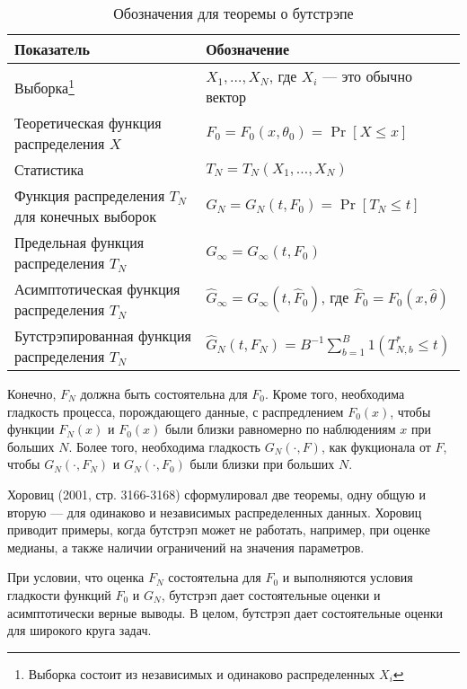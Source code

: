 \begin{table}[h]
\begin{center}
\caption{\label{tab:notatboot} Обозначения для теоремы о бутстрэпе}
\begin{minipage}{\textwidth}
\begin{tabular}{ll}
\hline
\hline
Показатель & Обозначение \\ 
\hline 
Выборка\footnote{Выборка состоит из независимых и одинаково распределенных $X_i$} & $X_1, \ldots, X_N$, где $X_i$ --- это обычно вектор \\ 
Теоретическая функция распределения $X$ & $F_0 = F_0(x, \theta_0) = \Pr[X \leq x]$ \\
Статистика & $T_N = T_N(X_1, \ldots, X_N)$ \\
Функция распределения $T_N$ для конечных выборок & $G_N = G_N(t, F_0) = \Pr[T_N \leq t]$ \\
Предельная функция распределения $T_N$ & $G_{\infty} = G_{\infty}(t, F_0)$ \\
Асимптотическая функция распределения $T_N$ & $\hat{G}_{\infty} = G_{\infty}(t, \hat{F}_0)$, где $\hat{F}_0 = F_0(x, \hat{\theta})$ \\
Бутстрэпированная функция распределения $T_N$ & $\hat{G}_N(t, F_N) = B^{-1} \sum_{b=1}^B 1(T^*_{N,b} \leq t)$ \\
\hline
\hline
\end{tabular}
\end{minipage}
\end{center}
\end{table} 

Конечно, $F_N$ должна быть состоятельна для $F_0$. Кроме того, необходима гладкость процесса, порождающего данные, с распредлением $F_0(x)$, чтобы функции $F_N(x)$ и $F_0(x)$ были  близки равномерно по наблюдениям $x$ при больших $N$. Более того, необходима гладкость $G_N(\cdot,F)$, как фукционала от $F$, чтобы  $G_N(\cdot,F_N)$ и $G_N(\cdot,F_0)$ были близки при больших $N$. 

Хоровиц (2001, стр. 3166-3168) сформулировал две теоремы, одну общую и вторую --- для одинаково и независимых распределенных данных. Хоровиц приводит примеры, когда бутстрэп может не работать, например, при оценке медианы, а также наличии ограничений на  значения параметров.

При условии, что оценка $F_N$ состоятельна для $F_0$ и выполняются условия гладкости функций $F_0$ и $G_N$, бутстрэп дает состоятельные оценки и асимптотически верные выводы. В целом, бутстрэп дает состоятельные оценки для широкого круга задач.

